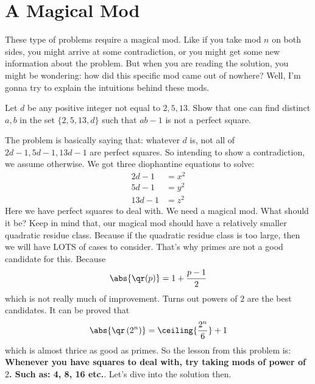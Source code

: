 \documentclass[11pt]{scrartcl}
\begin{document}
\section{A Magical Mod}
These type of problems require a magical mod. Like if you take mod \(n\) on both sides, you might arrive at some contradiction, or you might get some new information about the problem. But when you are reading the solution, you might be wondering: how did this specific mod came out of nowhere? Well, I'm gonna try to explain the intuitions behind these mods. 
\begin{exercise}
Let \(d\) be any positive integer not equal to \(2, 5, 13\). Show that one can find distinct \(a, b\) in the set \(\{2,5,13, d\}\) such that \(ab−1\) is not a perfect square.
\end{exercise}
The problem is basically saying that: whatever \(d\) is, not all of \(2d-1, 5d-1, 13d-1\) are perfect squares. So intending to show a contradiction, we assume otherwise. We got three diophantine equations to solve:
\begin{equation*}
\begin{split}
2d-1 &= x^2 \\
5d -1 &= y^2 \\
13d-1 &= z^2
\end{split}
\end{equation*}
Here we have perfect squares to deal with. We need a magical mod. What should it be? Keep in mind that, our magical mod should have a relatively smaller quadratic residue class. Because if the quadratic residue class is too large, then we will have LOTS of cases to consider. That's why primes are not a good candidate for this. Because 
\[ \abs{\qr(p)} = 1 + \frac{p-1}{2}\]
which is not really much of improvement. Turns out powers of \(2\) are the best candidates. It can be proved that 
\[\abs{ \qr \left(2^n\right) } = \ceiling{\frac{2^n}{6}} + 1\]
which is almost thrice as good as primes. So the lesson from this problem is: \textbf{Whenever you have squares to deal with, try taking mods of power of \(2\). Such as: 4, 8, 16 etc.}. Let's dive into the solution then.
\end{document}
